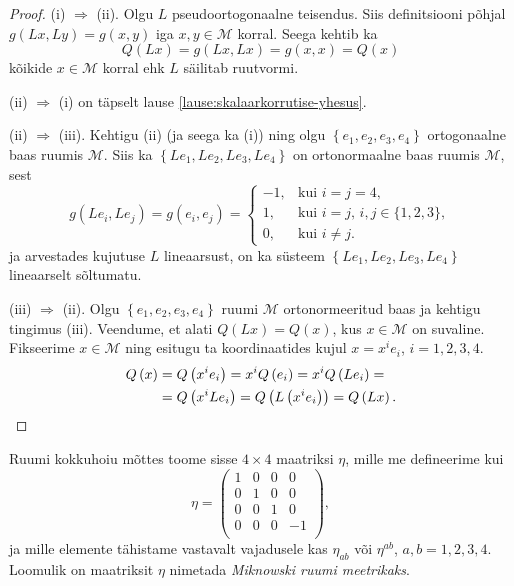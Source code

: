 \documentclass[12pt,a4paper,oneside]{article}
\theoremstyle{plain}
\theoremstyle{definition}
\numberwithin{equation}{section}
\def\M{{\mathcal M}}
\begin{document}
\begin{proof}
(i) $\Rightarrow$ (ii). Olgu $L$ pseudoortogonaalne teisendus. Siis 
definitsiooni põhjal $g\left(Lx, Ly\right) = g\left(x, y\right)$ iga 
$x, y \in \M$ korral. Seega kehtib ka 
\[Q\left(Lx\right) = 
g\left(Lx, Lx\right) = g\left(x, x\right) = Q\left(x\right)\] 
kõikide $x \in \M$ korral ehk $L$ säilitab ruutvormi.

(ii) $\Rightarrow$ (i) on täpselt lause 
\ref{lause:skalaarkorrutise-yhesus}.

(ii) $\Rightarrow$ (iii). Kehtigu (ii) (ja seega ka (i)) ning 
olgu $\left\lbrace e_1, e_2, e_3, e_4 \right\rbrace$ ortogonaalne 
baas ruumis $\M$. Siis ka $\left\lbrace Le_1, Le_2, Le_3, Le_4 
\right\rbrace$ on ortonormaalne baas ruumis $\M$, sest
\begin{equation*}
g \left(Le_i, Le_j\right) = g\left(e_i, e_j\right) = \begin{cases}
    -1,& \text{kui $i = j = 4$},\\
    1,& \text{kui $i = j$, $i,j \in \{1, 2, 3\}$},\\
    0,& \text{kui $i \neq j$}.
  \end{cases}
\end{equation*}
ja arvestades kujutuse $L$ lineaarsust, on ka süsteem 
$\left\lbrace Le_1, Le_2, Le_3, Le_4 \right\rbrace$ lineaarselt 
sõltumatu.

(iii) $\Rightarrow$ (ii). Olgu $\left\lbrace e_1, e_2, e_3, e_4 
\right\rbrace$ ruumi $\M$ ortonormeeritud baas ja kehtigu tingimus 
(iii). Veendume, et alati $Q\left(Lx\right) = Q\left(x\right)$, 
kus $x \in \M$ on suvaline. Fikseerime $x \in \M$ ning esitugu ta 
koordinaatides kujul $x = x^i e_i$, $i = 1, 2, 3, 4$.
\begin{align*}
Q\left(x\right) &= Q\left(x^i e_i\right) = x^i Q\left(e_i\right) = 
x^i Q\left(Le_i\right) = \\
&= Q\left(x^i L e_i\right) = Q\left(L\left(x^i e_i\right)\right) = 
Q\left(Lx\right). \qedhere
\end{align*}
\end{proof}
%
Ruumi kokkuhoiu mõttes toome sisse $4 \times 4$ maatriksi $\eta$, 
mille me defineerime kui
\begin{equation*}
\eta = \begin{pmatrix}
1 & 0 & 0 & 0 \\ 
0 & 1 & 0 & 0 \\  
0 & 0 & 1 & 0 \\ 
0 & 0 & 0 & -1 \\ 
\end{pmatrix},
\end{equation*}
ja mille elemente tähistame vastavalt vajadusele kas $\eta_{ab}$ või 
$\eta^{ab}$, $a, b = 1, 2, 3, 4$. Loomulik on maatriksit $\eta$ 
nimetada \emph{Miknowski ruumi meetrikaks}.
\end{document}
